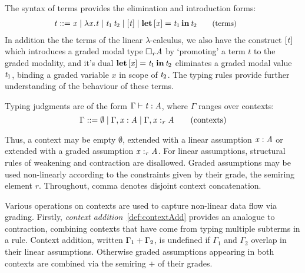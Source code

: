 The syntax of terms provides the elimination and introduction forms:
\begin{align*}
\hspace{-0.8em} \mathit{t} ::= \;
       & \mathit{x}
  \mid \lambda  \mathit{x}  .  \mathit{t}
  \mid \mathit{t_{{\mathrm{1}}}} \, \mathit{t_{{\mathrm{2}}}}
  \mid [  \mathit{t}  ]
  \mid \textbf{let} \, [  \mathit{x}  ] =  \mathit{t_{{\mathrm{1}}}}  \, \textbf{in} \,  \mathit{t_{{\mathrm{2}}}}
{\small{\tag{terms}}}
\end{align*}
In addition the the terms of the linear $\lambda$-calculus, we also have the
construct $[  \mathit{t}  ]$ which introduces a graded modal type $\Box_{  \mathit{r}  }  \mathit{A}$ by `promoting' a term $t$ to the graded modality, and it's dual $\textbf{let} \, [  \mathit{x}  ] =  \mathit{t_{{\mathrm{1}}}}  \, \textbf{in} \,  \mathit{t_{{\mathrm{2}}}}$ eliminates a graded modal value $\mathit{t_{{\mathrm{1}}}}$, binding a graded variable $x$
in scope of $\mathit{t_{{\mathrm{2}}}}$. The typing rules provide further understanding of the
behaviour of these terms.

Typing judgments are of the form $\Gamma  \vdash  \mathit{t}  :  \mathit{A}$, where $\Gamma$ ranges over contexts:
\begin{equation*}
  \Gamma ::= \emptyset
  \mid \Gamma  \GRANULEsym{,}   \GRANULEmv{x}  :  \GRANULEnt{A}
  \mid \Gamma  \GRANULEsym{,}   \GRANULEmv{x}  :_{\textcolor{coeffectColor}{  \GRANULEnt{r}  } }   \GRANULEnt{A}
\tag{contexts}
\end{equation*}

Thus, a context may be empty $\emptyset$, extended with a
linear assumption $\mathit{x}  :  \mathit{A}$ or extended with a graded assumption $\GRANULEmv{x}  :_{\textcolor{coeffectColor}{  \GRANULEnt{r}  } }   \GRANULEnt{A}$. For linear assumptions, structural rules of weakening
and contraction are disallowed. Graded assumptions may be used
non-linearly according to the constraints given by their grade, the
semiring element $r$. Throughout, comma denotes disjoint context
concatenation.

Various operations on contexts are used to capture non-linear data flow
via grading. Firstly, \emph{context addition}~\eqref{def:contextAdd} provides an
analogue to contraction, combining contexts that have come from
typing multiple subterms in a rule.
Context addition, written $\Gamma_{{\mathrm{1}}}  +  \Gamma_{{\mathrm{2}}}$, is undefined if $\Gamma_{{\mathrm{1}}}$ and $\Gamma_{{\mathrm{2}}}$
overlap in their linear assumptions. Otherwise graded assumptions appearing
in both contexts are combined via the semiring $+$ of their grades.

